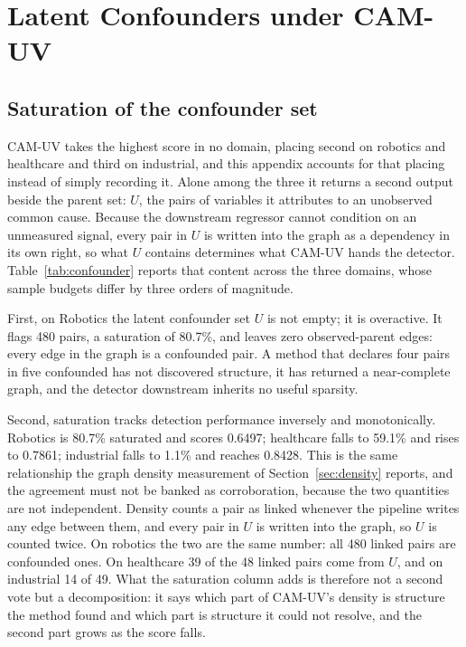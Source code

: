 \chapter{Latent Confounders under CAM-UV}
\label{app:confounders}

\section{Saturation of the confounder set}
\label{sec:confounders}

CAM-UV takes the highest score in no domain, placing second on robotics and healthcare and third on industrial, and this appendix accounts for that placing instead of simply recording it. Alone among the three it returns a second output beside the parent set: $U$, the pairs of variables it attributes to an unobserved common cause. Because the downstream regressor cannot condition on an unmeasured signal, every pair in $U$ is written into the graph as a dependency in its own right, so what $U$ contains determines what CAM-UV hands the detector. Table~\ref{tab:confounder} reports that content across the three domains, whose sample budgets differ by three orders of magnitude.



First, on Robotics the latent confounder set $U$ is not empty; it is overactive. It flags 480 pairs, a saturation of 80.7\%, and leaves zero observed-parent edges: every edge in the graph is a confounded pair. A method that declares four pairs in five confounded has not discovered structure, it has returned a near-complete graph, and the detector downstream inherits no useful sparsity.

Second, saturation tracks detection performance inversely and monotonically. Robotics is 80.7\% saturated and scores 0.6497; healthcare falls to 59.1\% and rises to 0.7861; industrial falls to 1.1\% and reaches 0.8428. This is the same relationship the graph density measurement of Section~\ref{sec:density} reports, and the agreement must not be banked as corroboration, because the two quantities are not independent. Density counts a pair as linked whenever the pipeline writes any edge between them, and every pair in $U$ is written into the graph, so $U$ is counted twice. On robotics the two are the same number: all 480 linked pairs are confounded ones. On healthcare 39 of the 48 linked pairs come from $U$, and on industrial 14 of 49. What the saturation column adds is therefore not a second vote but a decomposition: it says which part of CAM-UV's density is structure the method found and which part is structure it could not resolve, and the second part grows as the score falls.

